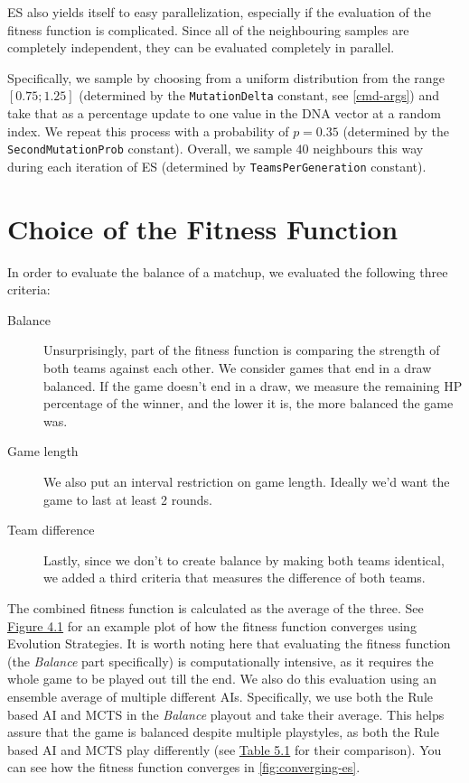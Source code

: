 ES also yields itself to easy parallelization, especially if the evaluation of the fitness
function is complicated. Since all of the neighbouring samples are completely independent,
they can be evaluated completely in parallel.

Specifically, we sample by choosing from a uniform distribution from the range $[0.75;1.25]$ (determined by the \verb|MutationDelta| constant, see \autoref{cmd-args}) and take that as a percentage update to one value in the DNA vector at a random index. We repeat this process with a probability of $p = 0.35$ (determined by the \verb|SecondMutationProb| constant). Overall, we sample $40$ neighbours this way during each iteration of ES (determined by \verb|TeamsPerGeneration| constant).

\section{Choice of the Fitness Function}

In order to evaluate the balance of a matchup, we evaluated the following three
criteria:

\begin{description}
\item [Balance] Unsurprisingly, part of the fitness function is comparing the
  strength of both teams against each other.  We consider games that end in a
    draw balanced.  If the game doesn't end in a draw, we measure the remaining
    HP percentage of the winner, and the lower it is, the more balanced the
    game was.
\item [Game length] We also put an interval restriction on game length. Ideally
  we'd want the game to last at least 2 rounds.
\item [Team difference] Lastly, since we don't to create balance by making both
  teams identical, we added a third criteria that measures the difference of
    both teams.
\end{description}

The combined fitness function is calculated as the average of the three. See \hyperref[fig:converging-es]{Figure 4.1} for an example plot of how the fitness function converges using Evolution Strategies. It is worth noting here that evaluating the fitness function (the \emph{Balance} part specifically) is computationally intensive, as it requires the whole game to be played out till the end. We also do this evaluation using an ensemble average of multiple different AIs. Specifically, we use both the Rule based AI and MCTS in the \emph{Balance} playout and take their average. This helps assure that the game is balanced despite multiple playstyles, as both the Rule based AI and MCTS play differently (see \hyperref[tab:winrates]{Table 5.1} for their comparison). You can see how the fitness function converges in \autoref{fig:converging-es}.


